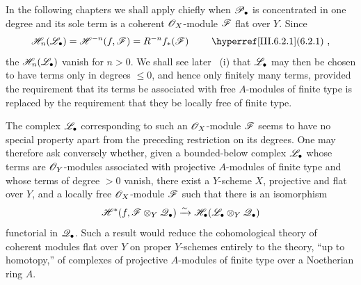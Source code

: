 \begin{remark}[6.10.6]
\label{III.6.10.6}
In the following chapters we shall apply 
chiefly when $\mathscr{P}_\bullet$ is concentrated in one degree and
its sole term is a coherent $\mathscr{O}_X$-module $\mathscr{F}$ flat over
$Y$.  Since
\[
  \sh H_n(\sh L_\bullet)
  =
  \sh H^{-n}(f,\sh F)
  =
  R^{-n}f_*(\sh F)
  \qquad\text{\sref{III.6.2.1}},
\]
the $\mathscr{H}_n(\mathscr{L}_\bullet)$ vanish for $n>0$.  We shall see
later ~(i) that $\mathscr{L}_\bullet$ may then be
chosen to have terms only in degrees $\leq0$, and hence only
finitely many terms, provided the requirement that its terms
be associated with free $A$-modules of finite type is replaced
by the requirement that they be locally free of finite type.

The complex $\mathscr{L}_\bullet$ corresponding to such an
$\mathscr{O}_X$-module $\mathscr{F}$ seems to have no special property
apart from the preceding restriction on its degrees.  One may
therefore ask conversely whether, given a bounded-below complex
$\mathscr{L}_\bullet$ whose terms are $\mathscr{O}_Y$-modules associated
with projective $A$-modules of finite type and whose terms of
degree $>0$ vanish, there exist a $Y$-scheme $X$, projective and
flat over $Y$, and a locally free $\mathscr{O}_X$-module $\mathscr{F}$ such
that there is an isomorphism
\[
  \mathscr{H}^*
  (f,\mathscr{F}\otimes_Y\mathscr{Q}_\bullet)
  \xrightarrow{\sim}
  \mathscr{H}_\bullet
  (\mathscr{L}_\bullet\otimes_Y\mathscr{Q}_\bullet)
\]
functorial in $\mathscr{Q}_\bullet$.  Such a result would reduce the
cohomological theory of coherent modules flat over $Y$ on
proper $Y$-schemes entirely to the theory, ``up to homotopy,''
of complexes of projective $A$-modules of finite type over a
Noetherian ring $A$.
\end{remark}
